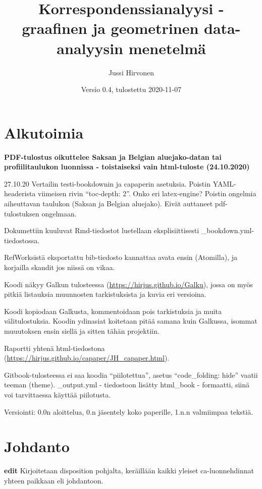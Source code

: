 \documentclass[
  finnish,
]{book}
\title{Korrespondenssianalyysi - graafinen ja geometrinen data-analyysin
menetelmä}
\author{Jussi Hirvonen}
\date{Versio 0.4, tulostettu 2020-11-07}
\begin{document}
\frontmatter
\maketitle

\mainmatter
\hypertarget{alkutoimia}{%
\chapter*{Alkutoimia}\label{alkutoimia}}

\textbf{PDF-tulostus oikuttelee Saksan ja Belgian aluejako-datan tai
profiilitaulukon luonnissa - toistaiseksi vain html-tuloste
(24.10.2020)}

27.10.20 Vertailin testi-bookdownin ja capaperin asetuksia. Poistin
YAML-headerista viimeisen rivin ``toc-depth: 2''. Onko eri latex-engine?
Poistin ongelmia aiheuttavan taulukon (Saksan ja Belgian aluejako).
Eivät auttaneet pdf-tulostuksen ongelmaan.

Dokumettiin kuuluvat Rmd-tiedostot luetellaan eksplisiittisesti
\_bookdown.yml-tiedostossa.

RefWorksistä eksportattu bib-tiedosto kannattaa avata ensin (Atomilla),
ja korjailla skandit jos niissä on vikaa.

Koodi näkyy Galkun tulosteessa (\url{https://hirjus.github.io/Galku}),
jossa on myös pitkiä listauksia muunnosten tarkistuksista ja kuvia eri
versioina.

Koodi kopiodaan Galkusta, kommentoidaan pois tarkistuksia ja muita
välitulostuksia. Koodin ydinasiat koitetaan pitää samana kuin Galkussa,
isommat muuutoksen ensin siellä ja sitten tähän projektiin.

Raportti yhtenä html-tiedostona
(\url{https://hirjus.github.io/capaper/JH_capaper.html}).

Gitbook-tulosteessa ei saa koodia ``piilotettua'', asetus
``code\_folding: hide'' vaatii teeman (theme). \_output.yml - tiedostoon
lisätty html\_book - formaatti, siinä voi tarvittaessa käyttää
piilotusta.

Versiointi: 0.0n aloittelua, 0.n jäsentely koko paperille, 1.n.n
valmiimpaa tekstiä.

\hypertarget{johdanto}{%
\chapter{Johdanto}\label{johdanto}}

\textbf{edit} Kirjoitetaan disposition pohjalta, keräillään kaikki
yleiset ca-luonnehdinnat yhteen paikkaan eli johdantoon.
\end{document}
